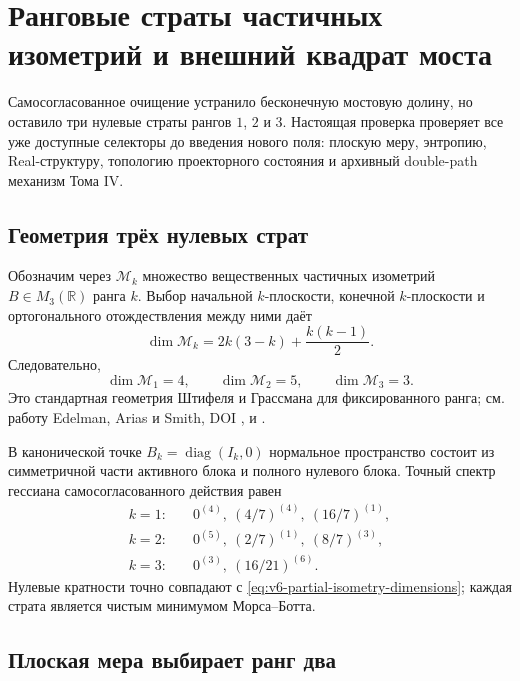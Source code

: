 \chapter{Ранговые страты частичных изометрий и внешний квадрат моста}

Самосогласованное очищение устранило бесконечную мостовую долину, но
оставило три нулевые страты рангов $1$, $2$ и $3$. Настоящая проверка
проверяет все уже доступные селекторы до введения нового поля: плоскую
меру, энтропию, Real-структуру, топологию проекторного состояния и
архивный double-path механизм Тома IV.

\section{Геометрия трёх нулевых страт}

Обозначим через $\mathcal M_k$ множество вещественных частичных изометрий
$B\in M_3(\mathbb R)$ ранга $k$. Выбор начальной $k$-плоскости, конечной
$k$-плоскости и ортогонального отождествления между ними даёт
\begin{equation}
 \dim\mathcal M_k
 =2k(3-k)+\frac{k(k-1)}2.
\end{equation}
Следовательно,
\begin{equation}
 \dim\mathcal M_1=4,
 \qquad
 \dim\mathcal M_2=5,
 \qquad
 \dim\mathcal M_3=3.
 \label{eq:v6-partial-isometry-dimensions}
\end{equation}
Это стандартная геометрия Штифеля и Грассмана для фиксированного ранга;
см. работу Edelman, Arias и Smith, DOI
, и
.

В канонической точке $B_k=\operatorname{diag}(I_k,0)$ нормальное
пространство состоит из симметричной части активного блока и полного
нулевого блока. Точный спектр гессиана самосогласованного действия равен
\begin{align}
 k=1:&\quad 0^{(4)},\ (4/7)^{(4)},\ (16/7)^{(1)},\nonumber\\
 k=2:&\quad 0^{(5)},\ (2/7)^{(1)},\ (8/7)^{(3)},\nonumber\\
 k=3:&\quad 0^{(3)},\ (16/21)^{(6)}.
 \label{eq:v6-rank-stratum-hessians}
\end{align}
Нулевые кратности точно совпадают с
\eqref{eq:v6-partial-isometry-dimensions}; каждая страта является чистым
минимумом Морса--Ботта.

\section{Плоская мера выбирает ранг два}

